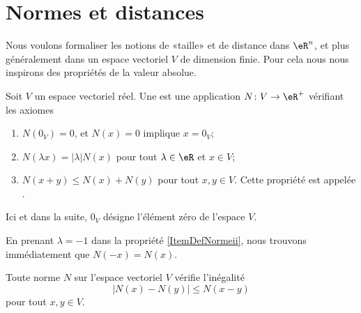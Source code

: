 \section{Normes et distances}\label{Sect_definition}

Nous voulons formaliser les notions de «taille» et de distance dans $\eR^n$, et plus généralement dans un espace vectoriel $V$ de dimension finie. Pour cela nous nous inspirons des propriétés de la valeur absolue.
\begin{definition}		\label{DefNorme}
	Soit $V$ un espace vectoriel réel. Une  est une application $N\colon V\to \eR^+$ vérifiant les axiomes 
	\begin{enumerate}

		\item
			$N(0_V)=0$, et $N(x)=0$ implique $x=0_V$;
		\item\label{ItemDefNormeii}
			$N(\lambda x)=| \lambda |N(x)$ pour tout $\lambda\in\eR$ et $x\in V$;
		\item\label{ItemDefNormeiii}
			$N(x+y)\leq N(x)+N(y)$ pour tout $x,y\in V$. Cette propriété est appelée .
	\end{enumerate}
	Ici et dans la suite, $0_V$ désigne l'élément zéro de l'espace $V$.
\end{definition}
En prenant $\lambda=-1$ dans la propriété \ref{ItemDefNormeii}, nous trouvons immédiatement que $N(-x)=N(x)$.

\begin{proposition}		\label{PropNmNNm}
	Toute norme $N$ sur l'espace vectoriel $V$ vérifie l'inégalité
	\begin{equation}
		\big| N(x)-N(y) \big|\leq N(x-y)
	\end{equation}
	pour tout $x,y\in V$.
\end{proposition}
	
